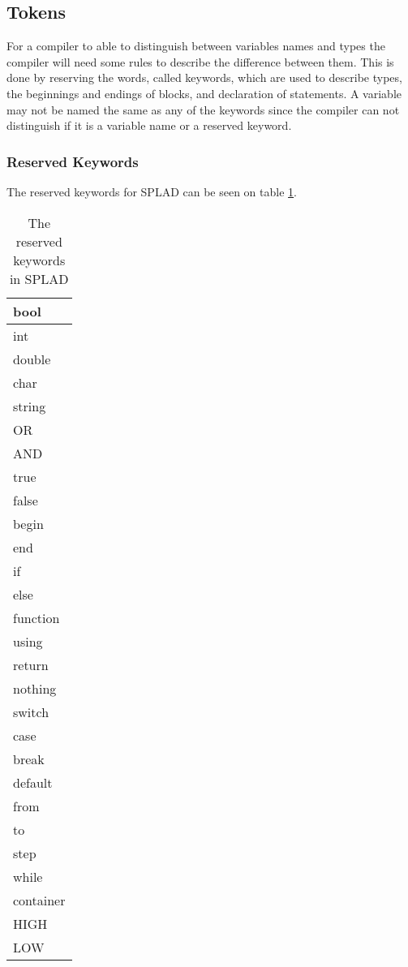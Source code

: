 \subsection{Tokens}
For a compiler to able to distinguish between variables names and types the compiler will need some rules to describe the difference between them. This is done by reserving the words, called keywords, which are used to describe types, the beginnings and endings of blocks, and declaration of statements. A variable may not be named the same as any of the keywords since the compiler can not distinguish if it is a variable name or a reserved keyword.

\subsubsection{Reserved Keywords}
The reserved keywords for SPLAD can be seen on table \ref{tab:keywords}.

\begin{table}[H]
	\begin{tabular}{|l|}
		\hline
		bool 		\\ \hline
		int 		\\ \hline
		double		\\ \hline
		char 		\\ \hline
		string 		\\ \hline
		OR	 		\\ \hline
		AND 		\\ \hline
		true 		\\ \hline
		false 		\\ \hline
		begin 		\\ \hline
		end 		\\ \hline
		if	 		\\ \hline
		else 		\\ \hline
		function 	\\ \hline
		using 		\\ \hline
		return 		\\ \hline
		nothing 	\\ \hline
		switch 		\\ \hline
		case 		\\ \hline
		break 		\\ \hline
		default 	\\ \hline
		from 		\\ \hline
		to	 		\\ \hline
		step 		\\ \hline
		while 		\\ \hline
		container	\\ \hline
		HIGH 		\\ \hline
		LOW 		\\ \hline
	\end{tabular}
	\caption{The reserved keywords in SPLAD}
	\label{tab:keywords}
\end{table}

